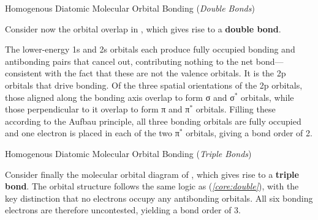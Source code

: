 \documentclass[10pt]{article}
\begin{document}
    \begin{core}[label=core:double]{Homogenous Diatomic Molecular Orbital Bonding (\textit{Double Bonds})}

      Consider now the orbital overlap in , which gives rise to a \textbf{double bond}.


      The lower-energy 1s and 2s orbitals each produce fully occupied bonding and antibonding pairs that cancel out, contributing nothing to the net bond---consistent with the fact that these are not the valence orbitals. It is the 2p orbitals that drive bonding. Of the three spatial orientations of the 2p orbitals, those aligned along the bonding axis overlap to form σ and σ$^*$ orbitals, while those perpendicular to it overlap to form π and π$^*$ orbitals. Filling these according to the Aufbau principle, all three bonding orbitals are fully occupied and one electron is placed in each of the two π$^*$ orbitals, giving a bond order of 2.

    \end{core}

    \begin{core}{Homogenous Diatomic Molecular Orbital Bonding (\textit{Triple Bonds})}

      Consider finally the molecular orbital diagram of , which gives rise to a \textbf{triple bond}. The orbital structure follows the same logic as  (\textit{\autoref{core:double}}), with the key distinction that no electrons occupy any antibonding orbitals. All six bonding electrons are therefore uncontested, yielding a bond order of 3.


    \end{core}
\end{document}
